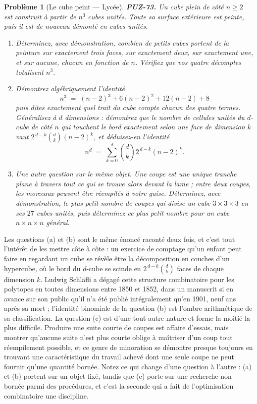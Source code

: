 \documentclass[11pt]{article}
\newtheorem{problem}{Problème}
\begin{document}
\begin{problem}[{Le cube peint --- Lycée}]
\textbf{PUZ-73.} Un cube plein de côté $ n \ge 2 $ est construit à partir de
$ n^{3} $ cubes unités. Toute sa surface extérieure est peinte, puis il est de nouveau
démonté en cubes unités.
\begin{enumerate}
\item[(a)] Déterminez, avec démonstration, combien de petits cubes portent de la peinture sur
exactement trois faces, sur exactement deux, sur exactement une, et sur aucune, chacun en
fonction de $ n $. Vérifiez que vos quatre décomptes totalisent $ n^{3} $.
\item[(b)] Démontrez algébriquement l'identité
\[ n^{3} \;=\; (n-2)^{3} + 6(n-2)^{2} + 12(n-2) + 8 \]
puis dites exactement quel trait du cube compte chacun des quatre termes. Généralisez à
$ d $ dimensions : démontrez que le nombre de cellules unités du $ d $-cube de côté
$ n $ qui touchent le bord exactement selon une face de dimension $ k $ vaut
$ 2^{\,d-k}\binom{d}{k}(n-2)^{k} $, et déduisez-en l'identité
\[ n^{d} \;=\; \sum_{k=0}^{d} \binom{d}{k} 2^{\,d-k} (n-2)^{k} . \]
\item[(c)] Une autre question sur le même objet. Une coupe est une unique tranche plane à travers
tout ce qui se trouve alors devant la lame ; entre deux coupes, les morceaux peuvent être
réempilés à votre guise. Déterminez, avec démonstration, le plus petit nombre de coupes qui
divise un cube $ 3 \times 3 \times 3 $ en ses $ 27 $ cubes unités, puis déterminez ce
plus petit nombre pour un cube $ n \times n \times n $ général.
\end{enumerate}

\end{problem}

\noindent Les questions (a) et (b) sont le même énoncé raconté deux fois, et c'est
tout l'intérêt de les mettre côte à côte : un exercice de comptage qu'un enfant peut faire
en regardant un cube se révèle être la décomposition en couches d'un hypercube, où le bord
du $ d $-cube se scinde en $ 2^{\,d-k}\binom{d}{k} $ faces de chaque dimension $ k $.
Ludwig Schläfli a dégagé cette structure combinatoire pour les polytopes en toutes
dimensions entre 1850 et 1852, dans un manuscrit si en avance sur son public qu'il n'a été
publié intégralement qu'en 1901, neuf ans après sa mort ; l'identité binomiale de la
question (b) est l'ombre arithmétique de sa classification. La question (c) est d'une tout
autre nature et forme la moitié la plus difficile. Produire une suite courte de coupes est
affaire d'essais, mais montrer qu'aucune suite n'est plus courte oblige à maîtriser d'un
coup tout réempilement possible, et ce genre de minoration se démontre presque toujours en
trouvant une caractéristique du travail achevé dont une seule coupe ne peut fournir qu'une
quantité bornée. Notez ce qui change d'une question à l'autre : (a) et (b) portent sur un
objet fixé, tandis que (c) porte sur une recherche non bornée parmi des procédures, et c'est
la seconde qui a fait de l'optimisation combinatoire une discipline.
\end{document}
